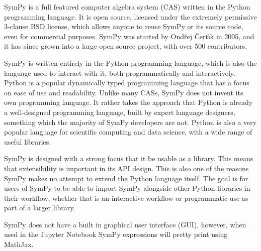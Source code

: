 SymPy is a full featured computer algebra system (CAS) written in the Python
programming language. It is open source, licensed under the extremely
permissive 3-clause BSD license, which allows anyone to reuse SymPy or its source code,
even for commercial purposes. SymPy was started by Ond\v{r}ej \v{C}ert\'{\i}k
in 2005, and it has since grown into a large open source project, with over
500 contributors.

SymPy is written entirely in the Python programming language,
which is also the language used to interact with it, both programmatically and
interactively. Python is a popular dynamically typed programming language that
has a focus on ease of use and readability. Unlike many CASs, SymPy does not
invent its own programming language. It rather takes the approach that Python
is already a well-designed programming language, built by expert language
designers, something which the majority of SymPy developers are not. Python is
also a very popular language for scientific computing and data science, with a
wide range of useful libraries.

SymPy is designed with a strong focus that it be usable as a library. This
means that extensibility is important in its API design. This is also one of
the reasons SymPy makes no attempt to extend the Python language itself. The
goal is for users of SymPy to be able to import SymPy alongside other Python
libraries in their workflow, whether that is an interactive workflow or
programmatic use as part of a larger library.

SymPy does not have a built in graphical user interface (GUI), however, when
used in the Jupyter Notebook
SymPy expressions will pretty print using MathJax.
